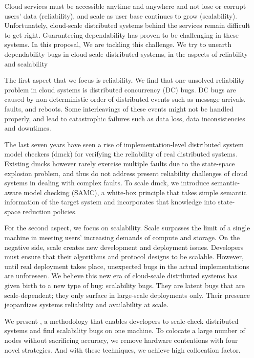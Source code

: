 Cloud services must be accessible anytime and anywhere and not lose or corrupt
users' data (reliability), and scale as user base continues to grow
(scalability). Unfortunately, cloud-scale distributed systems behind the
services remain difficult to get right. Guaranteeing dependability has proven
to be challenging in these systems. In this proposal, We are tackling this
challenge. We try to unearth dependability bugs in cloud-scale distributed
systems, in the aspects of reliability and scalability

The first aspect that we focus is reliability. We find that one unsolved
reliability problem in cloud systems is distributed concurrency (DC) bugs. DC
bugs are caused by non-deterministic order of distributed events such as message
arrivals, faults, and reboots. Some interleavings of these events might not be
handled properly, and lead to catastrophic failures such as data loss, data
inconsistencies and downtimes. 

The last seven years have seen a rise of implementation-level distributed system
model checkers (dmck) for verifying the reliability of real distributed systems.
Existing dmcks however rarely exercise multiple faults due to the state-space
explosion problem, and thus do not address present reliability challenges of
cloud systems in dealing with complex faults. To scale dmck, we introduce
semantic-aware model checking (SAMC), a white-box principle that takes simple
semantic information of the target system and incorporates that knowledge into
state-space reduction policies.

For the second aspect, we focus on scalability. Scale surpasses the limit of a
single machine in meeting users' increasing demands of compute and storage.  On
the negative side, scale creates new development and deployment issues.
Developers must ensure that their algorithms and protocol designs to be
scalable. However, until real deployment takes place, unexpected bugs in the
actual implementations are unforeseen. We believe this new era of cloud-scale
distributed systems has given birth to a new type of bug: scalability bugs.
They are latent bugs that are scale-dependent; they only surface in large-scale
deployments only. Their presence jeopardizes systems reliability and
availability at scale.

We present \sck, a methodology that enables developers to scale-check
distributed systems and find scalability bugs on one machine. To colocate a
large number of nodes without sacrificing accuracy, we remove hardware
contentions with four novel strategies. And with these techniques, we achieve
high collocation factor.

